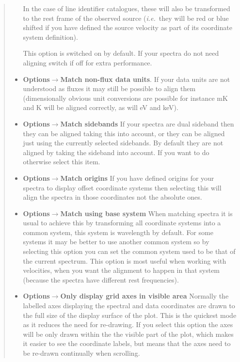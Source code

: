 \documentclass[twoside,11pt]{article}
\newcommand{\latexhtml}[2]{#1}
\renewcommand{\_}{\texttt{\symbol{95}}}
\newcommand{\submenuitem}[2]{\latexhtml{\textbf{#1$\rightarrow$#2}}{\textbf{#1->#2}}}
\newcommand{\ie}{\textit{i.e.}}
\begin{document}
\begin{quote}
\begin{itemize}
  In the case of line identifier catalogues, these will also be transformed to
  the rest frame of the observed source (\ie\ they will be red or blue shifted
  if you have defined the source velocity as part of its coordinate system
  definition).

  This option is switched on by default. If your spectra do not need aligning
  switch if off for extra performance.

  \item \submenuitem{Options}{Match non-flux data units}.
  If your data units are not understood as fluxes it may still be possible to
  align them (dimensionally obvious unit conversions are possible for instance
  mK and K will be aligned correctly, as will eV and keV).

  \item \submenuitem{Options}{Match sidebands}
  If your spectra are dual sideband then they can be aligned taking this
  into account, or they can be aligned just using the currently selected
  sidebands. By default they are not aligned by taking the sideband into
  account.  If you want to do otherwise select this item.

  \item \submenuitem{Options}{Match origins}
  If you have defined origins for your spectra to display offset coordinate
  systems then selecting this will align the spectra in those coordinates
  not the absolute ones.

  \item \submenuitem{Options}{Match using base system}
  When matching spectra it is usual to achieve this by transforming all
  coordinate systems into a common system, this system is wavelength by
  default. For some systems it may be better to use another common system
  so by selecting this option you can set the common system used to be that of
  the current spectrum. This option is most useful when working with
  velocities, when you want the alignment to happen in that system
  (because the spectra have different rest frequencies).

  \item \submenuitem{Options}{Only display grid axes in visible area}
  Normally the labelled axes displaying the spectral and data coordinates are
  drawn to the full size of the display surface of the plot. This is the
  quickest mode as it reduces the need for re-drawing. If you select this
  option the axes will be only drawn within the the visible part of the plot,
  which makes it easier to see the coordinate labels, but means that the axes
  need to be re-drawn continually when scrolling.


\end{itemize}
\end{quote}
\end{document}
